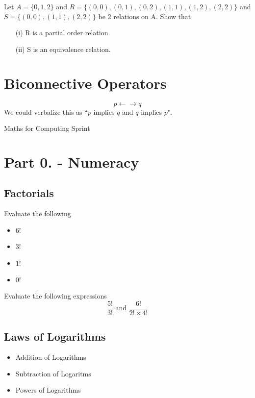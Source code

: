 \documentclass[]{report}
\begin{document}
\begin{enumerate}
Let $A=\{0,1,2\}$ and $R=\{ (0,0),(0,1),(0,2),(1,1), (1,2), (2,2)\}$
and $S=\{(0,0),(1,1),(2,2)\}$ be 2 relations on A. Show that

\begin{itemize}
\item[(i)] R is a partial order relation.
\item[(ii)] S is an equivalence relation.
\end{itemize}




\section*{Biconnective Operators}

\[ p \leftarrow \rightarrow q\]
We could verbalize this as ``$p$ implies $q$ and $q$ implies $p$".




Maths for Computing Sprint

\section*{Part 0. - Numeracy}
\subsection{Factorials}
Evaluate the following
\begin{itemize}
\item $6!$
\item $3!$
\item $1!$
\item $0!$
\end{itemize}
Evaluate the following expressions
\[  \frac{5!}{3!}  \mbox{   and   } \frac{6!}{2!\times 4!}  \]
\subsection*{Laws of Logarithms}
\begin{itemize}
\item Addition of Logarithms
\item Subtraction of Logaritms
\item Powers of Logarithms
\end{itemize}



\end{enumerate}
\end{document}
